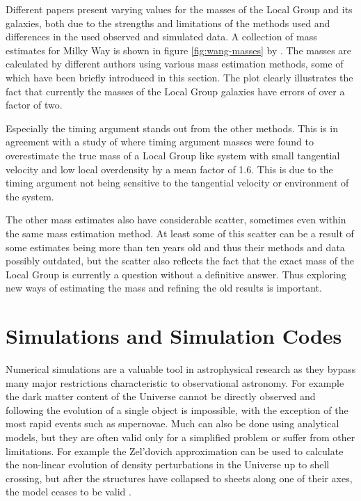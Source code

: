 \documentclass[english, twoside]{HYgradu}
\begin{document}
Different papers present varying values for the masses of the Local Group and its galaxies, both due to the strengths and limitations of the methods used and differences in the used observed and simulated data. A collection of mass estimates for Milky Way is shown in figure \ref{fig:wang-masses} by \citet{wang2015estimating}. The masses are calculated by different authors using various mass estimation methods, some of which have been briefly introduced in this section. The plot clearly illustrates the fact that currently the masses of the Local Group galaxies have errors of over a factor of two.

Especially the timing argument stands out from the other methods. This is in agreement with a study of \citet{gonzalez2014mass} where timing argument masses were found to overestimate the true mass of a Local Group like system with small tangential velocity and low local overdensity by a mean factor of 1.6. This is due to the timing argument not being sensitive to the tangential velocity or environment of the system.

The other mass estimates also have considerable scatter, sometimes even within the same mass estimation method. At least some of this scatter can be a result of some estimates being more than ten years old and thus their methods and data possibly outdated, but the scatter also reflects the fact that the exact mass of the Local Group is currently a question without a definitive answer. Thus exploring new ways of estimating the mass and refining the old results is important.



\chapter{Simulations and Simulation Codes} \label{chapt:simulations}

Numerical simulations are a valuable tool in astrophysical research as they bypass many major restrictions characteristic to observational astronomy. For example the dark matter content of the Universe cannot be directly observed and following the evolution of a single object is impossible, with the exception of the most rapid events such as supernovae. Much can also be done using analytical models, but they are often valid only for a simplified problem or suffer from other limitations. For example the Zel'dovich approximation can be used to calculate the non-linear evolution of density perturbations in the Universe up to shell crossing, but after the structures have collapsed to sheets along one of their axes, the model ceases to be valid \citep{mo2010galaxy}.
\end{document}
